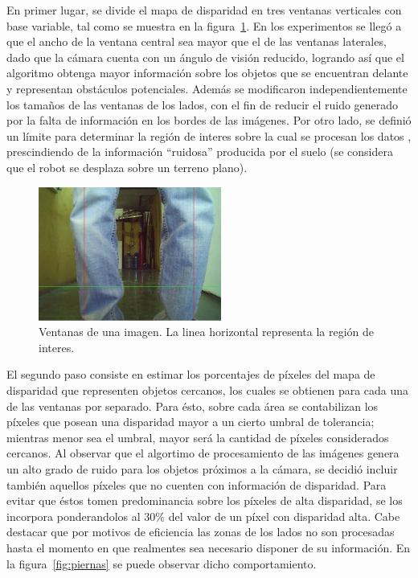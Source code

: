 \documentclass[journal]{IEEEtran}
\begin{document}
En primer lugar, se divide el mapa de disparidad en tres ventanas verticales con base variable, tal como se muestra en la figura~\ref{fig:piernas_cerca}. En los experimentos se lleg\'o a que el ancho de la ventana central sea mayor que el de las ventanas laterales, dado que la c\'amara cuenta con un \'angulo de visi\'on reducido, logrando as\'i que el algoritmo obtenga mayor informaci\'on sobre los objetos que se encuentran delante y representan obst\'aculos potenciales. Adem\'as se modificaron independientemente los tama\~nos de las ventanas de los lados, con el fin de reducir el ruido generado por la falta de informaci\'on en los bordes de las im\'agenes. Por otro lado, se defini\'o un l\'imite para determinar la regi\'on de interes sobre la cual se procesan los datos \cite{H09}, prescindiendo de la informaci\'on ``ruidosa'' producida por el suelo (se considera que el robot se desplaza sobre un terreno plano).

\begin{figure}[ht]
	\begin{center}
		\includegraphics[width=6cm]{./images/piernas_cerca.jpg}
	\end{center}
	\caption{Ventanas de una imagen. La linea horizontal representa la regi\'on de interes.}
	\label{fig:piernas_cerca}
\end{figure}

El segundo paso consiste en estimar los porcentajes de p\'ixeles del mapa de disparidad que representen objetos cercanos, los cuales se obtienen para cada una de las ventanas por separado. Para \'esto, sobre cada \'area se contabilizan los p\'ixeles que posean una disparidad mayor a un cierto umbral de tolerancia; mientras menor sea el umbral, mayor ser\'a la cantidad de p\'ixeles considerados cercanos. Al observar que el algortimo de procesamiento de las im\'agenes genera un alto grado de ruido para los objetos pr\'oximos a la c\'amara, se decidi\'o incluir tambi\'en aquellos p\'ixeles que no cuenten con informaci\'on de disparidad. Para evitar que \'estos tomen predominancia sobre los p\'ixeles de alta disparidad, se los incorpora ponderandolos al $30\%$ del valor de un p\'ixel con disparidad alta. Cabe destacar que por motivos de eficiencia las zonas de los lados no son procesadas hasta el momento en que realmentes sea necesario disponer de su informaci\'on. En la figura~\ref{fig:piernas} se puede observar dicho comportamiento.
\end{document}
